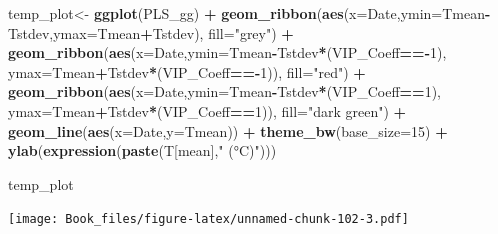 \documentclass[
]{book}
\newenvironment{Shaded}{\begin{snugshade}}{\end{snugshade}}
\newcommand{\DataTypeTok}[1]{\textcolor[rgb]{0.13,0.29,0.53}{#1}}
\newcommand{\DecValTok}[1]{\textcolor[rgb]{0.00,0.00,0.81}{#1}}
\newcommand{\KeywordTok}[1]{\textcolor[rgb]{0.13,0.29,0.53}{\textbf{#1}}}
\newcommand{\NormalTok}[1]{#1}
\newcommand{\OperatorTok}[1]{\textcolor[rgb]{0.81,0.36,0.00}{\textbf{#1}}}
\newcommand{\StringTok}[1]{\textcolor[rgb]{0.31,0.60,0.02}{#1}}
\begin{document}
\begin{Shaded}
\begin{Highlighting}[]
\NormalTok{temp_plot<-}\StringTok{ }\KeywordTok{ggplot}\NormalTok{(PLS_gg) }\OperatorTok{+}
\StringTok{  }\KeywordTok{geom_ribbon}\NormalTok{(}\KeywordTok{aes}\NormalTok{(}\DataTypeTok{x=}\NormalTok{Date,}\DataTypeTok{ymin=}\NormalTok{Tmean}\OperatorTok{-}\NormalTok{Tstdev,}\DataTypeTok{ymax=}\NormalTok{Tmean}\OperatorTok{+}\NormalTok{Tstdev),}
              \DataTypeTok{fill=}\StringTok{"grey"}\NormalTok{) }\OperatorTok{+}
\StringTok{  }\KeywordTok{geom_ribbon}\NormalTok{(}\KeywordTok{aes}\NormalTok{(}\DataTypeTok{x=}\NormalTok{Date,}\DataTypeTok{ymin=}\NormalTok{Tmean}\OperatorTok{-}\NormalTok{Tstdev}\OperatorTok{*}\NormalTok{(VIP_Coeff}\OperatorTok{==-}\DecValTok{1}\NormalTok{),}
                  \DataTypeTok{ymax=}\NormalTok{Tmean}\OperatorTok{+}\NormalTok{Tstdev}\OperatorTok{*}\NormalTok{(VIP_Coeff}\OperatorTok{==-}\DecValTok{1}\NormalTok{)),}
              \DataTypeTok{fill=}\StringTok{"red"}\NormalTok{) }\OperatorTok{+}
\StringTok{  }\KeywordTok{geom_ribbon}\NormalTok{(}\KeywordTok{aes}\NormalTok{(}\DataTypeTok{x=}\NormalTok{Date,}\DataTypeTok{ymin=}\NormalTok{Tmean}\OperatorTok{-}\NormalTok{Tstdev}\OperatorTok{*}\NormalTok{(VIP_Coeff}\OperatorTok{==}\DecValTok{1}\NormalTok{),}
                  \DataTypeTok{ymax=}\NormalTok{Tmean}\OperatorTok{+}\NormalTok{Tstdev}\OperatorTok{*}\NormalTok{(VIP_Coeff}\OperatorTok{==}\DecValTok{1}\NormalTok{)),}
              \DataTypeTok{fill=}\StringTok{"dark green"}\NormalTok{) }\OperatorTok{+}
\StringTok{  }\KeywordTok{geom_line}\NormalTok{(}\KeywordTok{aes}\NormalTok{(}\DataTypeTok{x=}\NormalTok{Date,}\DataTypeTok{y=}\NormalTok{Tmean)) }\OperatorTok{+}
\StringTok{  }\KeywordTok{theme_bw}\NormalTok{(}\DataTypeTok{base_size=}\DecValTok{15}\NormalTok{) }\OperatorTok{+}
\StringTok{  }\KeywordTok{ylab}\NormalTok{(}\KeywordTok{expression}\NormalTok{(}\KeywordTok{paste}\NormalTok{(T[mean],}\StringTok{" (°C)"}\NormalTok{)))}

\NormalTok{temp_plot}
\end{Highlighting}
\end{Shaded}

\texttt{[image: Book\_files/figure-latex/unnamed-chunk-102-3.pdf]}
\end{document}
